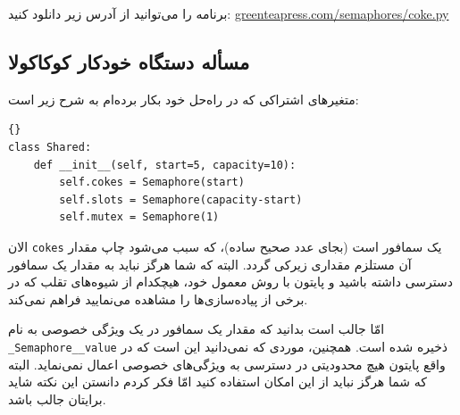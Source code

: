 \documentclass{book}
\newcommand{\clearemptydoublepage}{\newpage\cleardoublepage}
\begin{document}
    برنامه را می‌توانید از آدرس زیر دانلود کنید:
\url{greenteapress.com/semaphores/coke.py}


\clearemptydoublepage
\subsection {مسأله دستگاه خودکار کوکاکولا}

    متغیرهای اشتراکی که در راه‌حل خود بکار برده‌ام به شرح زیر است:

\begin{latin}
\begin{lstlisting}[title={}]{}
class Shared:
    def __init__(self, start=5, capacity=10):
        self.cokes = Semaphore(start)
        self.slots = Semaphore(capacity-start)
        self.mutex = Semaphore(1)
\end{lstlisting}
\end{latin}

    الان {\tt cokes} یک سمافور است (بجای عدد صحیح ساده)، که سبب می‌شود چاپ مقدار آن مستلزم مقداری زیرکی گردد. 
    البته که  شما هرگز نباید به مقدار یک سمافور دسترسی داشته باشید و پایتون با روش معمول خود، هیچکدام از شیوه‌های تقلب که در برخی از پیاده‌سازی‌ها را 
    مشاهده می‌نمایید  فراهم نمی‌کند. 

    امّا جالب است بدانید که مقدار یک سمافور در یک ویژگی خصوصی به نام {\tt \_Semaphore\_\_value} ذخیره شده است. 
    همچنین، موردی که نمی‌دانید این است که در واقع پایتون هیچ محدودیتی در دسترسی به ویژگی‌های خصوصی اعمال نمی‌نماید. 
    البته که شما هرگز نباید از این امکان استفاده کنید امّا فکر کردم دانستن این نکته شاید برایتان جالب باشد. 

\end{document}
